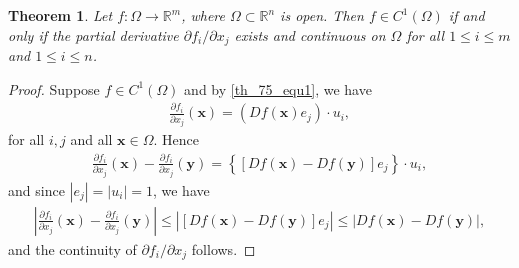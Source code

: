 \documentclass[10pt]{book}
\newtheorem{theorem}{Theorem}[chapter]
\theoremstyle{definition}
\numberwithin{equation}{chapter}
\begin{document}
\begin{theorem}
Let $f: \Omega \to \mathbb{R}^m$, where $\Omega \subset \mathbb{R}^n$ is open. Then $f \in C^1(\Omega)$ if and only if the partial derivative $\partial f_i/\partial x_j$ exists and continuous on $\Omega$ for all $1 \leq i \leq m$ and $1 \leq i \leq n$.
\end{theorem}
\begin{proof}
Suppose $f \in C^1(\Omega)$ and by \eqref{th_75_equ1}, we have
\begin{align*}
    \frac{\partial f_i}{\partial x_j}(\mathbf{x}) = \left(Df(\mathbf{x}) e_j\right) \cdot u_i,
\end{align*}
for all $i,j$ and all $\mathbf{x} \in \Omega$. Hence 
\begin{align*}
    \frac{\partial f_i}{\partial x_j}(\mathbf{x}) - \frac{\partial f_i}{\partial x_j}(\mathbf{y}) = \left\{[Df(\mathbf{x}) - Df(\mathbf{y})] e_j\right\} \cdot u_i,
\end{align*}
and since $\left|e_j\right| = \left|u_i\right| = 1$, we have
\begin{align*}
    \left|\frac{\partial f_i}{\partial x_j}(\mathbf{x}) - \frac{\partial f_i}{\partial x_j}(\mathbf{y})\right| \leq \left|[Df(\mathbf{x}) - Df(\mathbf{y})] e_j\right| \leq \left|Df(\mathbf{x}) - Df(\mathbf{y})\right|,
\end{align*}
and the continuity of $\partial f_i/\partial x_j$ follows.


\end{proof}
\end{document}
